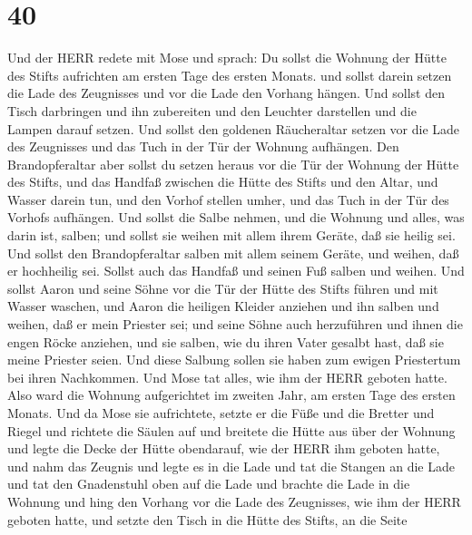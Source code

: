 \hypertarget{section-39}{%
\section{40}\label{section-39}}

 Und der HERR redete mit Mose und sprach:  Du
sollst die Wohnung der Hütte des Stifts aufrichten am ersten Tage des
ersten Monats.  und sollst darein setzen die Lade des
Zeugnisses und vor die Lade den Vorhang hängen.  Und sollst
den Tisch darbringen und ihn zubereiten und den Leuchter darstellen und
die Lampen darauf setzen.  Und sollst den goldenen
Räucheraltar setzen vor die Lade des Zeugnisses und das Tuch in der Tür
der Wohnung aufhängen.  Den Brandopferaltar aber sollst du
setzen heraus vor die Tür der Wohnung der Hütte des Stifts, 
und das Handfaß zwischen die Hütte des Stifts und den Altar, und Wasser
darein tun,  und den Vorhof stellen umher, und das Tuch in
der Tür des Vorhofs aufhängen.  Und sollst die Salbe nehmen,
und die Wohnung und alles, was darin ist, salben; und sollst sie weihen
mit allem ihrem Geräte, daß sie heilig sei.  Und sollst den
Brandopferaltar salben mit allem seinem Geräte, und weihen, daß er
hochheilig sei.  Sollst auch das Handfaß und seinen Fuß
salben und weihen.  Und sollst Aaron und seine Söhne vor
die Tür der Hütte des Stifts führen und mit Wasser waschen,
 und Aaron die heiligen Kleider anziehen und ihn salben und
weihen, daß er mein Priester sei;  und seine Söhne auch
herzuführen und ihnen die engen Röcke anziehen,  und sie
salben, wie du ihren Vater gesalbt hast, daß sie meine Priester seien.
Und diese Salbung sollen sie haben zum ewigen Priestertum bei ihren
Nachkommen.  Und Mose tat alles, wie ihm der HERR geboten
hatte.  Also ward die Wohnung aufgerichtet im zweiten Jahr,
am ersten Tage des ersten Monats.  Und da Mose sie
aufrichtete, setzte er die Füße und die Bretter und Riegel und richtete
die Säulen auf  und breitete die Hütte aus über der Wohnung
und legte die Decke der Hütte obendarauf, wie der HERR ihm geboten
hatte,  und nahm das Zeugnis und legte es in die Lade und
tat die Stangen an die Lade und tat den Gnadenstuhl oben auf die Lade
 und brachte die Lade in die Wohnung und hing den Vorhang
vor die Lade des Zeugnisses, wie ihm der HERR geboten hatte,
 und setzte den Tisch in die Hütte des Stifts, an die Seite
